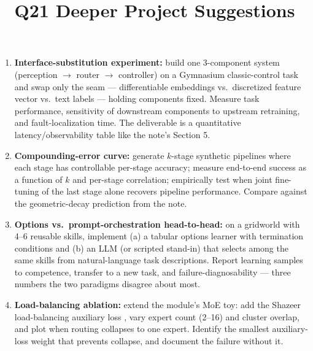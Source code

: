 \documentclass[11pt]{article}
\title{Q21 Deeper Project Suggestions}
\date{}
\begin{document}
\maketitle
\begin{enumerate}[noitemsep]
\item \textbf{Interface-substitution experiment:} build one 3-component system (perception $\to$ router $\to$ controller) on a Gymnasium classic-control task and swap only the seam --- differentiable embeddings vs.\ discretized feature vector vs.\ text labels --- holding components fixed. Measure task performance, sensitivity of downstream components to upstream retraining, and fault-localization time. The deliverable is a quantitative latency/observability table like the note's Section 5.
\item \textbf{Compounding-error curve:} generate $k$-stage synthetic pipelines where each stage has controllable per-stage accuracy; measure end-to-end success as a function of $k$ and per-stage correlation; empirically test when joint fine-tuning of the last stage alone recovers pipeline performance. Compare against the geometric-decay prediction from the note.
\item \textbf{Options vs.\ prompt-orchestration head-to-head:} on a gridworld with 4--6 reusable skills, implement (a) a tabular options learner with termination conditions \cite{sutton1999options,bacon2017optioncritic} and (b) an LLM (or scripted stand-in) that selects among the same skills from natural-language task descriptions. Report learning samples to competence, transfer to a new task, and failure-diagnosability --- three numbers the two paradigms disagree about most.
\item \textbf{Load-balancing ablation:} extend the module's MoE toy: add the Shazeer load-balancing auxiliary loss \cite{shazeer2017sparsely}, vary expert count (2--16) and cluster overlap, and plot when routing collapses to one expert. Identify the smallest auxiliary-loss weight that prevents collapse, and document the failure without it.
\end{enumerate}
\end{document}
